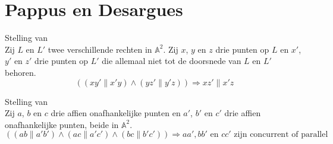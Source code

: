 \documentclass[main.tex]{subfiles}
\begin{document}
\section{Pappus en Desargues}
\label{sec:pappus-en-desargues}

\begin{st}
  Stelling van \\
  Zij $L$ en $L'$ twee verschillende rechten in $\mathbb{A}^{2}$.
  Zij $x$, $y$ en $z$ drie punten op $L$ en $x'$, $y'$ en $z'$ drie punten op $L'$ die allemaal niet tot de doorsnede van $L$ en $L'$ behoren.
  \[
    ((xy' \parallel x'y) \wedge (yz' \parallel y'z)) \Rightarrow xz' \parallel x'z
  \]
  
\end{st}

\begin{st}
  Stelling van \\
  Zij $a$, $b$ en $c$ drie affien onafhankelijke punten en $a'$, $b'$ en $c'$ drie affien onafhankelijke punten, beide in $\mathbb{A}^{2}$.
  \[  ((ab \parallel a'b') \wedge (ac \parallel a'c') \wedge (bc \parallel b'c')) \Rightarrow aa', bb' \text{ en } cc' \text{ zijn concurrent of parallel }\]
  
\end{st}
\end{document}
